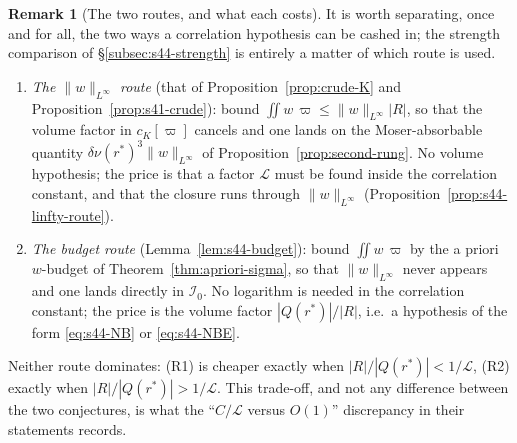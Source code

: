 \documentclass[11pt]{article}
\theoremstyle{definition}
\newtheorem{remark}[theorem]{Remark}
\theoremstyle{remark}
\begin{document}
\begin{remark}[The two routes, and what each costs]\label{rem:s44-two-routes}
  It is worth separating, once and for all, the two ways a correlation
  hypothesis can be cashed in; the strength comparison of
  \S\ref{subsec:s44-strength} is entirely a matter of which route is used.
  \begin{enumerate}[label=\textup{(R\arabic*)}]
    \item \emph{The $\|w\|_{L^\infty}$ route} (that of
      Proposition~\ref{prop:crude-K} and Proposition~\ref{prop:s41-crude}):
      bound $\iint w\,\varpi\leq\|w\|_{L^\infty}|R|$, so that the volume
      factor in $c_K[\varpi]$ cancels and one lands on the Moser-absorbable
      quantity $\delta\nu(r^*)^3\|w\|_{L^\infty}$ of
      Proposition~\ref{prop:second-rung}. No volume hypothesis; the price is
      that a factor $\mathcal{L}$ must be found inside the correlation
      constant, and that the closure runs through $\|w\|_{L^\infty}$
      (Proposition~\ref{prop:s44-linfty-route}).
    \item \emph{The budget route} (Lemma~\ref{lem:s44-budget}): bound
      $\iint w\,\varpi$ by the a priori $w$-budget of
      Theorem~\ref{thm:apriori-sigma}, so that $\|w\|_{L^\infty}$ never
      appears and one lands directly in $\mathcal{I}_0$. No logarithm is
      needed in the correlation constant; the price is the volume factor
      $|Q(r^*)|/|R|$, i.e.\ a hypothesis of the form \eqref{eq:s44-NB} or
      \eqref{eq:s44-NBE}.
  \end{enumerate}
  Neither route dominates: (R1) is cheaper exactly when
  $|R|/|Q(r^*)|<1/\mathcal{L}$, (R2) exactly when
  $|R|/|Q(r^*)|>1/\mathcal{L}$. This trade-off, and not any difference between
  the two conjectures, is what the ``$C/\mathcal{L}$ versus $O(1)$''
  discrepancy in their statements records.
\end{remark}
\end{document}
